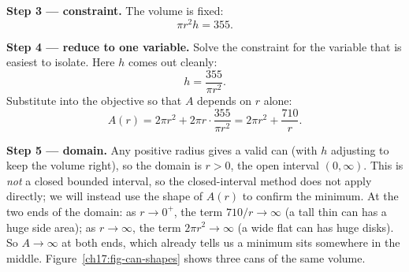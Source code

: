 \textbf{Step 3 --- constraint.} The volume is fixed:
\[
\pi r^2 h = 355.
\]

\textbf{Step 4 --- reduce to one variable.} Solve the constraint for the variable
that is easiest to isolate. Here $h$ comes out cleanly:
\[
h = \frac{355}{\pi r^2}.
\]
Substitute into the objective so that $A$ depends on $r$ alone:
\[
A(r) = 2\pi r^2 + 2\pi r\cdot \frac{355}{\pi r^2}
     = 2\pi r^2 + \frac{710}{r}.
\]

\textbf{Step 5 --- domain.} Any positive radius gives a valid can (with $h$ adjusting
to keep the volume right), so the domain is $r>0$, the open interval $(0,\infty)$.
This is \emph{not} a closed bounded interval, so the closed-interval method does not
apply directly; we will instead use the shape of $A(r)$ to confirm the minimum.
At the two ends of the domain: as $r\to 0^+$, the term $710/r\to\infty$ (a tall
thin can has a huge side area); as $r\to\infty$, the term $2\pi r^2\to\infty$ (a wide
flat can has huge disks). So $A\to\infty$ at both ends, which already tells us a
minimum sits somewhere in the middle. Figure~\ref{ch17:fig-can-shapes} shows three
cans of the same volume.

